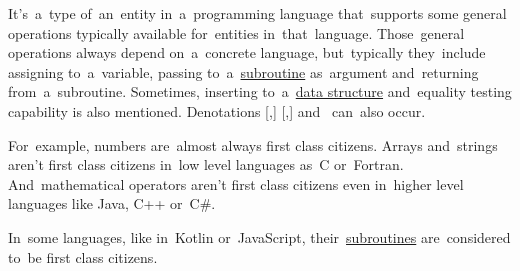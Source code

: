 \label{firstclass}
It's~a~type of~an~entity in~a~programming language that~supports some general operations typically available for~entities in~that~language.
Those~general operations always depend on~a~concrete language, but~typically they~include assigning to~a~variable, passing to~a~\hyperref[subroutine]{subroutine} as~argument and~returning from~a~subroutine.
Sometimes, inserting to~a~\hyperref[datastructure]{data structure} and~equality testing capability is also mentioned.
Denotations [,] [,]  and~ can~also occur.

For~example, numbers are~almost always first class citizens.
Arrays and~strings aren't first class citizens in~low level languages as~C or~Fortran.
And~mathematical operators aren't first class citizens even in~higher level languages like Java, C++ or~C\#.

In~some languages, like in~Kotlin or~JavaScript, their~\hyperref[subroutine]{subroutines} are~considered to~be first class citizens.
